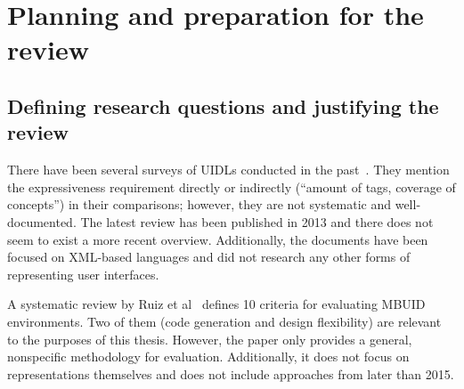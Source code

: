 \section[Planning and preparation]{Planning and preparation for the review}\label{sec:planning-and-preparation-for-review}

\subsection{Defining research questions and justifying the review}\label{subsec:defining-research-questions-and-justifying-the-review}

There have been several surveys of UIDLs conducted in the past~\cite{Souchon2003, guerrero_garcia_theoretical_2009, guerrero_garcia_theoretical_2011, Jovanovic2013}.
They mention the expressiveness requirement directly or indirectly (\enquote{amount of tags, coverage of concepts}) in their comparisons;
however, they are not systematic and well-documented.
The latest review has been published in 2013 and there does not seem to exist a more recent overview.
Additionally, the documents have been focused on XML-based languages and did not research any other forms of representing user interfaces.

A systematic review by Ruiz et al~\cite{Ruiz2018} defines 10 criteria for evaluating MBUID environments.
Two of them (code generation and design flexibility) are relevant to the purposes of this thesis.
However, the paper only provides a general, nonspecific methodology for evaluation.
Additionally, it does not focus on representations themselves and does not include approaches from later than 2015.

